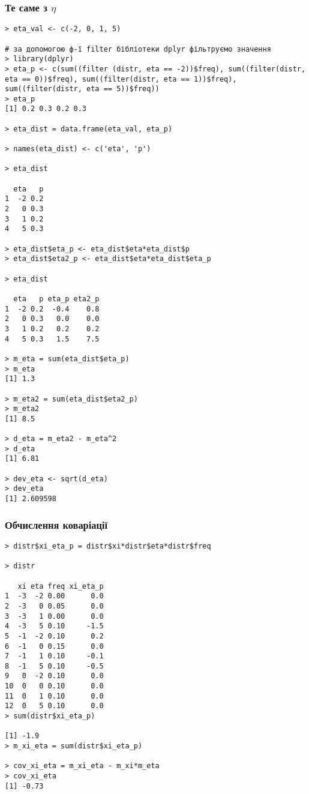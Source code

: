 \documentclass[a4paper, 12pt, oneside]{extarticle}
\begin{document}
\subsubsection{Те саме з $\eta$}

\begin{verbatim}
> eta_val <- c(-2, 0, 1, 5)

# за допомогою ф-ї filter бібліотеки dplyr фільтруємо значення
> library(dplyr)
> eta_p <- c(sum((filter (distr, eta == -2))$freq), sum((filter(distr, eta == 0))$freq), sum((filter(distr, eta == 1))$freq), sum((filter(distr, eta == 5))$freq))
> eta_p
[1] 0.2 0.3 0.2 0.3

> eta_dist = data.frame(eta_val, eta_p)

> names(eta_dist) <- c('eta', 'p')

> eta_dist

  eta   p
1  -2 0.2
2   0 0.3
3   1 0.2
4   5 0.3

> eta_dist$eta_p <- eta_dist$eta*eta_dist$p
> eta_dist$eta2_p <- eta_dist$eta*eta_dist$eta_p

> eta_dist

  eta   p eta_p eta2_p
1  -2 0.2  -0.4    0.8
2   0 0.3   0.0    0.0
3   1 0.2   0.2    0.2
4   5 0.3   1.5    7.5

> m_eta = sum(eta_dist$eta_p)
> m_eta
[1] 1.3

> m_eta2 = sum(eta_dist$eta2_p)
> m_eta2
[1] 8.5

> d_eta = m_eta2 - m_eta^2
> d_eta
[1] 6.81

> dev_eta <- sqrt(d_eta)
> dev_eta
[1] 2.609598
\end{verbatim}

\subsubsection{Обчислення коваріації}
\begin{verbatim}
> distr$xi_eta_p = distr$xi*distr$eta*distr$freq

> distr

   xi eta freq xi_eta_p
1  -3  -2 0.00      0.0
2  -3   0 0.05      0.0
3  -3   1 0.00      0.0
4  -3   5 0.10     -1.5
5  -1  -2 0.10      0.2
6  -1   0 0.15      0.0
7  -1   1 0.10     -0.1
8  -1   5 0.10     -0.5
9   0  -2 0.10      0.0
10  0   0 0.10      0.0
11  0   1 0.10      0.0
12  0   5 0.10      0.0
> sum(distr$xi_eta_p)

[1] -1.9
> m_xi_eta = sum(distr$xi_eta_p)

> cov_xi_eta = m_xi_eta - m_xi*m_eta
> cov_xi_eta
[1] -0.73
\end{verbatim}
\end{document}
